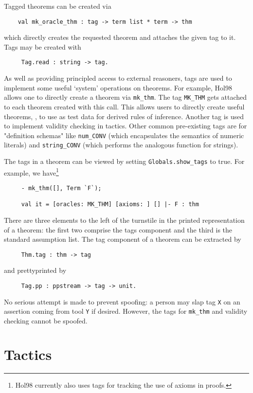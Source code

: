  Tagged theorems can be created via 
 \begin{verbatim}
    val mk_oracle_thm : tag -> term list * term -> thm
 \end{verbatim}
 which directly creates the requested theorem and attaches the given tag to
 it. Tags may be created with 
 \begin{verbatim}
     Tag.read : string -> tag.
 \end{verbatim}
As well as providing principled access to external reasoners, tags are
used to implement some useful `system' operations on theorems. For example,
Hol98 allows one to directly create a theorem via \verb+mk_thm+. The
tag \verb+MK_THM+ gets attached to each theorem created with this
call. This allows users to directly create useful theorems, \eg, to use
as test data for derived rules of inference. Another tag
is used to implement validity checking in tactics. Other common
pre-existing tags are for "definition schemas" like \verb+num_CONV+
(which encapsulates the semantics of numeric literals) and
\verb+string_CONV+ (which performs the analogous function for strings). 

The tags in a theorem can be viewed by setting \verb+Globals.show_tags+ to
true. For example, we have\footnote{Hol98 currently also uses tags for
tracking the use of axioms in proofs.}
\begin{verbatim}
     - mk_thm([], Term `F`);

     val it = [oracles: MK_THM] [axioms: ] [] |- F : thm
\end{verbatim}
There are three elements to the left of the turnstile in the printed
representation of a theorem: the first two comprise the tags component and the
third is the standard assumption list. The tag component of a theorem
can be extracted by  
 \begin{verbatim}
     Thm.tag : thm -> tag
 \end{verbatim}
\noindent and prettyprinted by 
 \begin{verbatim}
     Tag.pp : ppstream -> tag -> unit.
 \end{verbatim}


 No serious attempt is made to prevent spoofing: a person may slap tag
\verb+X+ on an assertion coming from tool \verb+Y+ if desired. However, the
tags for \verb+mk_thm+ and validity checking cannot be spoofed. 

\section{Tactics}

